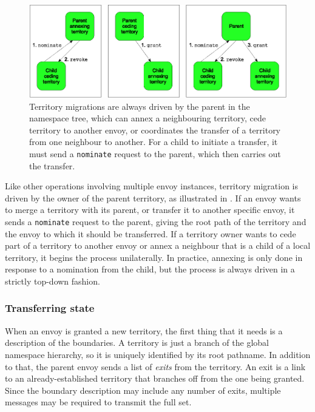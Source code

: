 \begin{figure}[t]
\centering
\includegraphics[width=\figwidth]{figures/grant-top-down}
\caption[Types of territory migrations]{Territory migrations are always driven by the parent in the namespace tree, which can annex a neighbouring territory, cede territory to another envoy, or coordinates the transfer of a territory from one neighbour to another. For a child to initiate a transfer, it must send a \texttt{nominate} request to the parent, which then carries out the transfer.}
\label{fig:grant-top-down}
\end{figure}

Like other operations involving multiple envoy instances, territory migration is driven by the owner of the parent territory, as illustrated in . If an envoy wants to merge a territory with its parent, or transfer it to another specific envoy, it sends a \texttt{nominate} request to the parent, giving the root path of the territory and the envoy to which it should be transferred. If a territory owner wants to cede part of a territory to another envoy or annex a neighbour that is a child of a local territory, it begins the process unilaterally. In practice, annexing is only done in response to a nomination from the child, but the process is always driven in a strictly top-down fashion.

\subsubsection{Transferring state}\label{sec:migrating-state}

When an envoy is granted a new territory, the first thing that it needs is a description of the boundaries. A territory is just a branch of the global namespace hierarchy, so it is uniquely identified by its root pathname. In addition to that, the parent envoy sends a list of \emph{exits} from the territory. An exit is a link to an already-established territory that branches off from the one being granted. Since the boundary description may include any number of exits, multiple messages may be required to transmit the full set.


